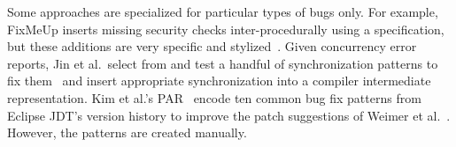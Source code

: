 Some approaches are specialized for particular types of bugs only. For example, FixMeUp inserts missing security checks inter-procedurally using a specification, but these additions are very specific and stylized~\cite{son2013fix}. Given concurrency error reports, Jin et al.~select from and test a handful of synchronization patterns to fix them~\cite{JZDLL:12} and insert appropriate synchronization into a compiler intermediate representation. Kim et al.'s PAR~\cite{Kim2013:PAR} encode ten common bug fix patterns from Eclipse JDT's version history to improve the patch suggestions of Weimer et al.~\cite{Weimer2009:AFP}. However, the patterns are created manually. 

